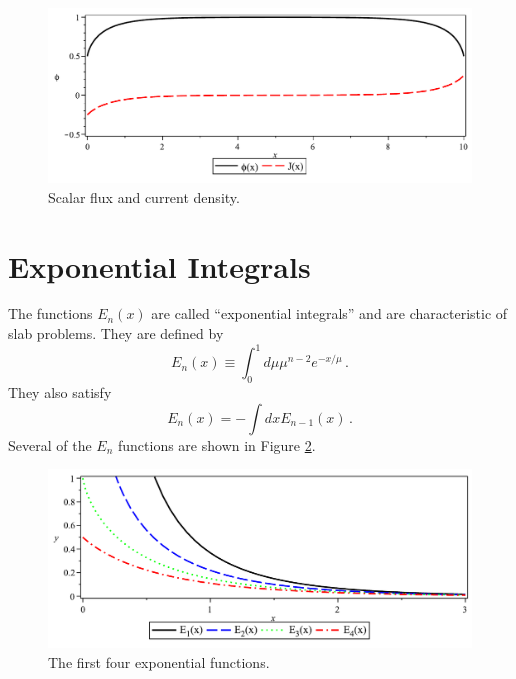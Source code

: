 \begin{figure}[ht] 
    \centering
    \includegraphics[keepaspectratio, width = 5.0 in]{slab_example_phi_current}
    \caption{Scalar flux and current density.}
    \label{fig:slab_example_phi_current}
\end{figure}

\section*{Exponential Integrals}

The functions $E_n(x)$ are called ``exponential integrals'' and are characteristic of slab problems.  They are defined by
\begin{equation}
 E_n(x) \equiv \int^1_0 d\mu \mu^{n-2} e^{-x/\mu} \, .
 \label{eq:EnDefinition}
\end{equation}
They also satisfy
\begin{equation}
 E_n(x) = - \int dx E_{n-1}(x) \, .
 \label{eq:EnIntegration}
\end{equation}
Several of the $E_n$ functions are shown in Figure \ref{fig:slab_example_exp_functions}.

\begin{figure}[ht] 
    \centering
    \includegraphics[keepaspectratio, width = 5.0 in]{slab_example_exp_functions}
    \caption{The first four exponential functions.}
    \label{fig:slab_example_exp_functions}
\end{figure}

